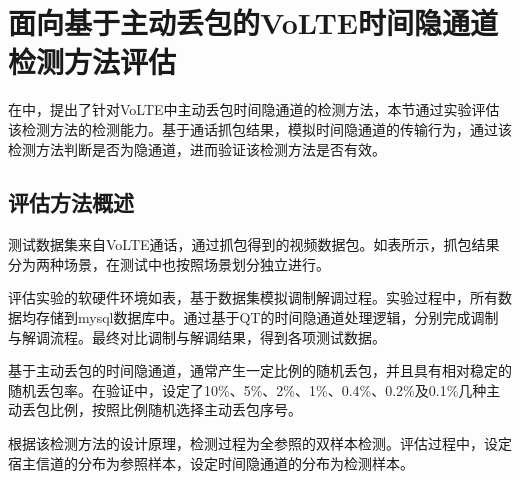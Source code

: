 \section{面向基于主动丢包的VoLTE时间隐通道检测方法评估}
\label{chap:analyze:result}

在中，提出了针对VoLTE中主动丢包时间隐通道的检测方法，本节通过实验评估该检测方法的检测能力。基于通话抓包结果，模拟时间隐通道的传输行为，通过该检测方法判断是否为隐通道，进而验证该检测方法是否有效。

\subsection{评估方法概述}
\label{chap:analyze:result:abstract}

测试数据集来自VoLTE通话，通过抓包得到的视频数据包。如表所示，抓包结果分为两种场景，在测试中也按照场景划分独立进行。


评估实验的软硬件环境如表，基于数据集模拟调制解调过程。实验过程中，所有数据均存储到mysql数据库中。通过基于QT的时间隐通道处理逻辑，分别完成调制与解调流程。最终对比调制与解调结果，得到各项测试数据。

基于主动丢包的时间隐通道，通常产生一定比例的随机丢包，并且具有相对稳定的随机丢包率。在验证中，设定了10\%、5\%、2\%、1\%、0.4\%、0.2\%及0.1\%几种主动丢包比例，按照比例随机选择主动丢包序号。

根据该检测方法的设计原理，检测过程为全参照的双样本检测。评估过程中，设定宿主信道的分布为参照样本，设定时间隐通道的分布为检测样本。

